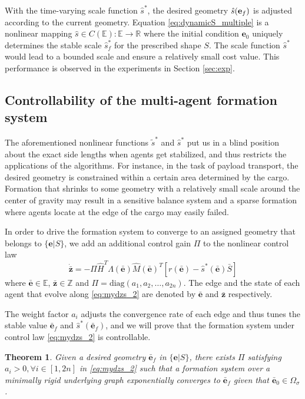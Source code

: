 \documentclass[times]{rncauth}
\newcommand{\be}{\ensuremath \mathbf{e}}
\newtheorem{thm}{Theorem}[section]
\begin{document}
With the time-varying scale function $\hat{s}^*$, the desired
geometry $\hat{s}(\be_{f})$ is adjusted according to the current
geometry. Equation \eqref{eq:dynamicS_multiple} is a
nonlinear mapping $\hat{s}\in C(\mathbb{E}): \mathbb{E} \rightarrow
\mathbb{R}$ where the
 initial condition  $\mathbf{e}_0$ uniquely determines the stable scale
$\hat{s}^*_f$ for the prescribed shape $S$. The scale function
$\hat{s}^*$ would lead to a bounded scale and ensure a relatively
small cost value. This performance is observed in the experiments in
Section \ref{sec:exp}.

\subsection{Controllability of the multi-agent formation
system}\label{sec:multiple} The aforementioned nonlinear functions
$\tilde{s}^*$ and $\hat{s}^*$ put us in a blind position about the
exact side lengths when agents get stabilized, and thus restricts
the applications of the algorithms. For instance, in the task of
payload transport, the desired geometry is constrained within a
certain area determined by the  cargo. Formation that shrinks to
some geometry with a relatively small scale  around the center of
gravity may result in a sensitive balance system and a sparse
formation where agents locate at the edge of the cargo may easily
failed.

In order to drive the formation system to converge to an assigned
geometry that belongs to $\{\mathbf{e}|S\}$, we add an additional
control gain $\Pi$ to the nonlinear control law
\begin{equation}\label{eq:mydzs_2}
  \dot{\bar{\mathbf{z}}}=-\Pi\hat{H}^T \hat{\Lambda}(\bar{\mathbf{e}})
  \hat{M}(\bar{\mathbf{e}})^T [r(\bar{\mathbf{e}})-\hat{s}^*(\bar{\mathbf{e}})\bar{S}]
\end{equation}
where $\bar{\mathbf{e}}\in\mathbb{E}$, $\bar{\mathbf{z}}\in
\mathbb{Z}$ and $\Pi=\text{diag}(a_1,a_2,\ldots,a_{2n})$. The edge
and the state of each agent that evolve along \eqref{eq:mydzs_2} are
denoted by $\bar{\mathbf{e}}$ and $\bar{\mathbf{z}}$ respectively.

The weight factor $a_i$ adjusts the convergence rate of each edge
and thus tunes the stable value $\bar{\mathbf{e}}_f$ and
$\hat{s}^*(\bar{\mathbf{e}}_f)$, and we will prove that  the
formation system under control law \eqref{eq:mydzs_2} is
controllable.
\begin{thm}
  Given a desired geometry $\bar{\mathbf{e}}_f$ in $\{\mathbf{e}|S\}$, there exists $\Pi$ satisfying
 $a_i>0, \forall i\in [1,2n]$ in \eqref{eq:mydzs_2} such that a formation
  system over a minimally rigid underlying graph exponentially converges to $\bar{\mathbf{e}}_f$ given that
  $\bar{\mathbf{e}}_0\in\Omega_\sigma$.
  \end{thm}
\end{document}
